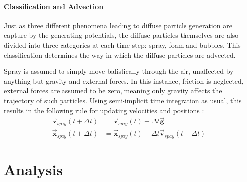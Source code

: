 \documentclass[oneside, a4paper]{book}
\newcommand\vek[1]{\vec{\bm{#1}}}
\newcommand\br[1]{\left(#1\right)}
\begin{document}
  \subsubsection{Classification and Advection}
  Just as three different phenomena leading to diffuse particle generation are capture by the generating potentials, the diffuse particles themselves are also divided into three categories at each time step: spray, foam and bubbles. This classification determines the way in which the diffuse particles are advected.

  Spray is assumed to simply move balistically through the air, unaffected by anything but gravity and external forces. In this instance, friction is neglected, external forces are assumed to be zero, meaning only gravity affects the trajectory of such particles. Using semi-implicit time integration as usual, this results in the following rule for updating velocities and positions \autocite{spray-foam-bubbles}:
  \begin{align}
    \vek{v}_{spay}\br{t+\Delta t} &= \vek{v}_{spay}\br{t} + \Delta t \vek{g}\\
    \vek{x}_{spay}\br{t+\Delta t} &= \vek{x}_{spay}\br{t} + \Delta t \vek{v}_{spay}\br{t+\Delta t}
  \end{align}



\chapter{Analysis}\label{chp:analysis}
\end{document}
